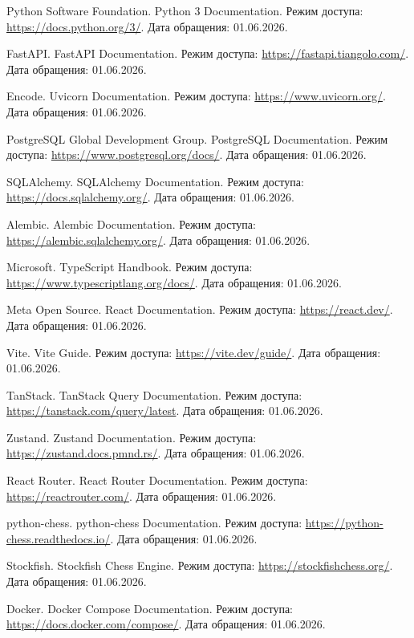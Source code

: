 
\begin{enumerate}[label={[\arabic*]},leftmargin=1.25cm,itemsep=0pt,topsep=0pt]
\item Python Software Foundation. Python 3 Documentation. Режим доступа: \url{https://docs.python.org/3/}. Дата обращения: 01.06.2026.
\item FastAPI. FastAPI Documentation. Режим доступа: \url{https://fastapi.tiangolo.com/}. Дата обращения: 01.06.2026.
\item Encode. Uvicorn Documentation. Режим доступа: \url{https://www.uvicorn.org/}. Дата обращения: 01.06.2026.
\item PostgreSQL Global Development Group. PostgreSQL Documentation. Режим доступа: \url{https://www.postgresql.org/docs/}. Дата обращения: 01.06.2026.
\item SQLAlchemy. SQLAlchemy Documentation. Режим доступа: \url{https://docs.sqlalchemy.org/}. Дата обращения: 01.06.2026.
\item Alembic. Alembic Documentation. Режим доступа: \url{https://alembic.sqlalchemy.org/}. Дата обращения: 01.06.2026.
\item Microsoft. TypeScript Handbook. Режим доступа: \url{https://www.typescriptlang.org/docs/}. Дата обращения: 01.06.2026.
\item Meta Open Source. React Documentation. Режим доступа: \url{https://react.dev/}. Дата обращения: 01.06.2026.
\item Vite. Vite Guide. Режим доступа: \url{https://vite.dev/guide/}. Дата обращения: 01.06.2026.
\item TanStack. TanStack Query Documentation. Режим доступа: \url{https://tanstack.com/query/latest}. Дата обращения: 01.06.2026.
\item Zustand. Zustand Documentation. Режим доступа: \url{https://zustand.docs.pmnd.rs/}. Дата обращения: 01.06.2026.
\item React Router. React Router Documentation. Режим доступа: \url{https://reactrouter.com/}. Дата обращения: 01.06.2026.
\item python-chess. python-chess Documentation. Режим доступа: \url{https://python-chess.readthedocs.io/}. Дата обращения: 01.06.2026.
\item Stockfish. Stockfish Chess Engine. Режим доступа: \url{https://stockfishchess.org/}. Дата обращения: 01.06.2026.
\item Docker. Docker Compose Documentation. Режим доступа: \url{https://docs.docker.com/compose/}. Дата обращения: 01.06.2026.

\end{enumerate}
